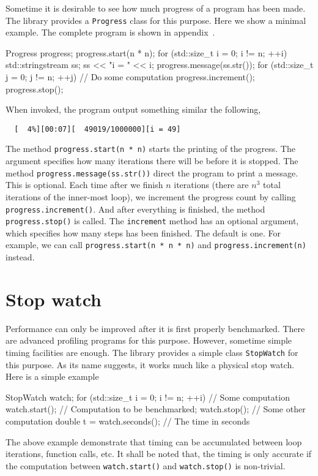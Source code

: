 Sometime it is desirable to see how much progress of a program has been made.
The library provides a \verb|Progress| class for this purpose. Here we show a
minimal example. The complete program is shown in
appendix~.
\begin{cppcode}
  Progress progress;
  progress.start(n * n);
  for (std::size_t i = 0; i != n; ++i) {
      std::stringstream ss;
      ss << "i = " << i;
      progress.message(ss.str());
      for (std::size_t j = 0; j != n; ++j) {
          // Do some computation
          progress.increment();
      }
  }
  progress.stop();
\end{cppcode}
When invoked, the program output something similar the following,
\begin{Verbatim}
  [  4%][00:07][  49019/1000000][i = 49]
\end{Verbatim}
The method \verb|progress.start(n * n)| starts the printing of the progress.
The argument specifies how many iterations there will be before it is stopped.
The method \verb|progress.message(ss.str())| direct the program to print a
message. This is optional. Each time after we finish $n$ iterations (there are
$n^3$ total iterations of the inner-most loop), we increment the progress count
by calling \verb|progress.increment()|. And after everything is finished, the
method \verb|progress.stop()| is called. The \verb|increment| method has an
optional argument, which specifies how many steps has been finished. The
default is one. For example, we can call \verb|progress.start(n * n * n)| and
\verb|progress.increment(n)| instead.

\section{Stop watch}
\label{sec:Stop watch}

Performance can only be improved after it is first properly benchmarked. There
are advanced profiling programs for this purpose. However, sometime simple
timing facilities are enough. The library provides a simple class
\verb|StopWatch| for this purpose. As its name suggests, it works much like a
physical stop watch. Here is a simple example
\begin{cppcode}
  StopWatch watch;
  for (std::size_t i = 0; i != n; ++i) {
      // Some computation
      watch.start();
      // Computation to be benchmarked;
      watch.stop();
      // Some other computation
  }
  double t = watch.seconds(); // The time in seconds
\end{cppcode}
The above example demonstrate that timing can be accumulated between loop
iterations, function calls, etc. It shall be noted that, the timing is only
accurate if the computation between \verb|watch.start()| and
\verb|watch.stop()| is non-trivial.
